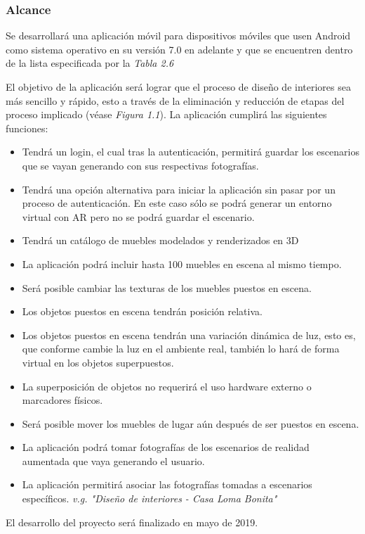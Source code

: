\subsubsection{Alcance}
Se desarrollará una aplicación móvil para dispositivos móviles que usen Android como sistema operativo en su versión 7.0 en adelante y que se encuentren dentro de la lista especificada por la \textit{Tabla 2.6}\par
El objetivo de la aplicación será lograr que el proceso de diseño de interiores sea más sencillo y rápido, esto a través de la eliminación y reducción de etapas del proceso implicado (véase \textit{Figura 1.1}).
La aplicación cumplirá las siguientes funciones:\par
\begin{itemize}
	\item Tendrá un login, el cual tras la autenticación, permitirá guardar los escenarios que se vayan generando con sus respectivas fotografías.
	\item Tendrá una opción alternativa para iniciar la aplicación sin pasar por un proceso de autenticación. En este caso sólo se podrá generar un entorno virtual con AR pero no se podrá guardar el escenario.
	\item Tendrá un catálogo de muebles modelados y renderizados en 3D
	\item La aplicación podrá incluir hasta 100 muebles en escena al mismo tiempo.
	\item Será posible cambiar las texturas de los muebles puestos en escena.
	\item Los objetos puestos en escena tendrán posición relativa.
	\item Los objetos puestos en escena tendrán una variación dinámica de luz, esto es, que conforme cambie la luz en el ambiente real, también lo hará de forma virtual en los objetos superpuestos.
	\item La superposición de objetos no requerirá el uso hardware externo o marcadores físicos.
	\item Será posible mover los muebles de lugar aún después de ser puestos en escena.
	\item La aplicación podrá tomar fotografías de los escenarios de realidad aumentada que vaya generando el usuario.
	\item La aplicación permitirá asociar las fotografías tomadas a escenarios específicos. \textit{v.g. "Diseño de interiores - Casa Loma Bonita"}
\end{itemize}
\noindent
El desarrollo del proyecto será finalizado en mayo de 2019.

